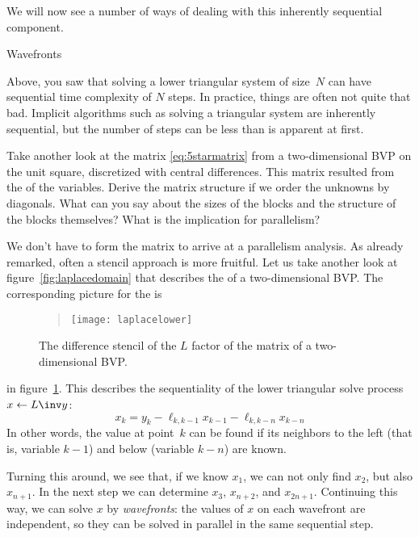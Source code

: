 We will now see a number of ways of dealing with this inherently
sequential component.

 {Wavefronts}
\label{sec:wavefront}

Above, you saw that solving a lower triangular system of size~$N$ can
have sequential time complexity of $N$ steps. In practice, things are
often not quite that bad. Implicit algorithms such as solving a
triangular system are inherently sequential, but the number of 
steps can be less than is apparent at first.

\begin{exercise}
  Take another look at the matrix \eqref{eq:5starmatrix}
  from a two-dimensional \ac{BVP} on the unit square,
  discretized with central differences.
  This matrix resulted from the 
  of the variables.
  Derive the matrix structure if we order the unknowns by diagonals.
  What can you say about the sizes of
  the blocks and the structure of the blocks themselves?
  What is the implication for parallelism?
\end{exercise}

We don't have to form the matrix to arrive at a parallelism analysis.
As already remarked, often a stencil approach is more fruitful.
Let us take another look at
figure~\ref{fig:laplacedomain} that describes the
%
of a two-dimensional \ac{BVP}. The corresponding picture for the
%
 is
\begin{figure}
  \begin{quote}
    \texttt{[image: laplacelower]}
  \end{quote}
  \caption{The difference stencil of the $L$ factor of the matrix
    of a two-dimensional \ac{BVP}.}
  \label{fig:laplacelower}
\end{figure}
in figure~\ref{fig:laplacelower}. This describes the sequentiality of
the lower triangular solve process $x\leftarrow L\inv y$:
\[ x_k = y_k - \ell_{k,k-1}x_{k-1} - \ell_{k,k-n}x_{k-n} \]
In other words, the value at point~$k$ can be found if its neighbors
to the left (that is, variable $k-1$) and below (variable $k-n$) are
known. 

Turning this around, we see that, if we know $x_1$, we can not only
find $x_2$, but also $x_{n+1}$. In the next step we can determine
$x_3$, $x_{n+2}$, and $x_{2n+1}$. Continuing this way, we can solve
$x$ by \emph{wavefronts}: the values of $x$ on each wavefront are
independent, so they can be solved in parallel in the same sequential
step.

